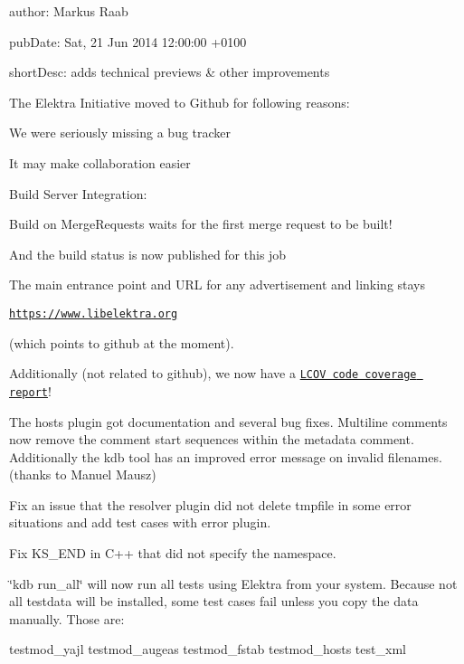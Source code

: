 
\begin{DoxyItemize}
\item author\+: Markus Raab
\item pub\+Date\+: Sat, 21 Jun 2014 12\+:00\+:00 +0100
\item short\+Desc\+: adds technical previews \& other improvements
\end{DoxyItemize}

The Elektra Initiative moved to Github for following reasons\+:


\begin{DoxyItemize}
\item We were seriously missing a bug tracker
\item It may make collaboration easier
\item Build Server Integration\+:
\begin{DoxyItemize}
\item Build on Merge\+Requests waits for the first merge request to be built!
\item And the build status is now published for this job
\end{DoxyItemize}
\end{DoxyItemize}

The main entrance point and U\+RL for any advertisement and linking stays

\href{https://www.libelektra.org}{\tt https\+://www.\+libelektra.\+org}

(which points to github at the moment).

Additionally (not related to github), we now have a \href{https://doc.libelektra.org/coverage/master/debian-buster-full}{\tt L\+C\+OV code coverage report}!

The hosts plugin got documentation and several bug fixes. Multiline comments now remove the comment start sequences within the metadata comment. Additionally the kdb tool has an improved error message on invalid filenames. (thanks to Manuel Mausz)

Fix an issue that the resolver plugin did not delete tmpfile in some error situations and add test cases with error plugin.

Fix K\+S\+\_\+\+E\+ND in C++ that did not specify the namespace.

\char`\"{}kdb run\+\_\+all\char`\"{} will now run all tests using Elektra from your system. Because not all testdata will be installed, some test cases fail unless you copy the data manually. Those are\+: \begin{DoxyVerb}testmod_yajl testmod_augeas testmod_fstab testmod_hosts test_xml
\end{DoxyVerb}


